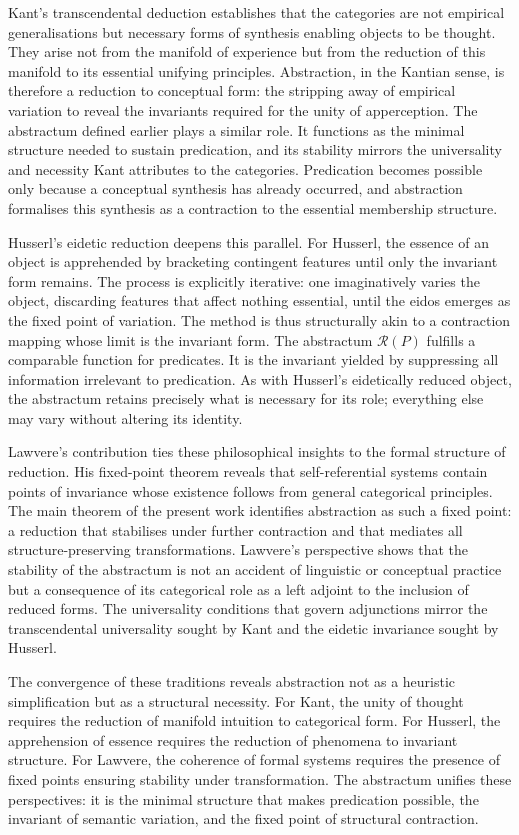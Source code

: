 \documentclass[12pt,letterpaper]{article}
\begin{document}
Kant’s transcendental deduction establishes that the categories are not empirical generalisations but necessary forms of synthesis enabling objects to be thought. They arise not from the manifold of experience but from the reduction of this manifold to its essential unifying principles. Abstraction, in the Kantian sense, is therefore a reduction to conceptual form: the stripping away of empirical variation to reveal the invariants required for the unity of apperception. The abstractum defined earlier plays a similar role. It functions as the minimal structure needed to sustain predication, and its stability mirrors the universality and necessity Kant attributes to the categories. Predication becomes possible only because a conceptual synthesis has already occurred, and abstraction formalises this synthesis as a contraction to the essential membership structure.

Husserl’s eidetic reduction deepens this parallel. For Husserl, the essence of an object is apprehended by bracketing contingent features until only the invariant form remains. The process is explicitly iterative: one imaginatively varies the object, discarding features that affect nothing essential, until the eidos emerges as the fixed point of variation. The method is thus structurally akin to a contraction mapping whose limit is the invariant form. The abstractum $\mathcal{R}(P)$ fulfills a comparable function for predicates. It is the invariant yielded by suppressing all information irrelevant to predication. As with Husserl’s eidetically reduced object, the abstractum retains precisely what is necessary for its role; everything else may vary without altering its identity.

Lawvere’s contribution ties these philosophical insights to the formal structure of reduction. His fixed-point theorem reveals that self-referential systems contain points of invariance whose existence follows from general categorical principles. The main theorem of the present work identifies abstraction as such a fixed point: a reduction that stabilises under further contraction and that mediates all structure-preserving transformations. Lawvere’s perspective shows that the stability of the abstractum is not an accident of linguistic or conceptual practice but a consequence of its categorical role as a left adjoint to the inclusion of reduced forms. The universality conditions that govern adjunctions mirror the transcendental universality sought by Kant and the eidetic invariance sought by Husserl.

The convergence of these traditions reveals abstraction not as a heuristic simplification but as a structural necessity. For Kant, the unity of thought requires the reduction of manifold intuition to categorical form. For Husserl, the apprehension of essence requires the reduction of phenomena to invariant structure. For Lawvere, the coherence of formal systems requires the presence of fixed points ensuring stability under transformation. The abstractum unifies these perspectives: it is the minimal structure that makes predication possible, the invariant of semantic variation, and the fixed point of structural contraction.
\end{document}
